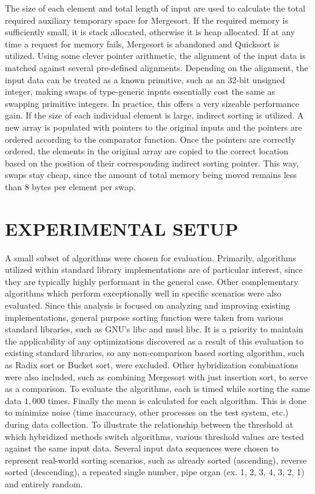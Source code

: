 \documentclass[12pt, conference]{ieeeconf}
\begin{document}
The size of each element and total length of input are used to calculate the
total required auxiliary temporary space for Mergesort. If the required memory
is sufficiently small, it is stack allocated, otherwise it is heap allocated. If
at any time a request for memory fails, Mergesort is abandoned and Quicksort is
utilized. Using some clever pointer arithmetic, the alignment of the input data
is matched against several pre-defined alignments. Depending on the alignment,
the input data can be treated as a known primitive, such as an 32-bit unsigned
integer, making swaps of type-generic inputs essentially cost the same as
swapping primitive integers. In practice, this offers a very sizeable
performance gain. If the size of each individual element is large, indirect
sorting is utilized. A new array is populated with pointers to the original
inputs and the pointers are ordered according to the comparator function. Once
the pointers are correctly ordered, the elements in the original array are
copied to the correct location based on the position of their corresponding
indirect sorting pointer. This way, swaps stay cheap, since the amount of total
memory being moved remains less than 8 bytes per element per swap.


\section{EXPERIMENTAL SETUP}

A small subset of algorithms were chosen for evaluation. Primarily, algorithms
utilized within standard library implementations are of particular interest,
since they are typically highly performant in the general case. Other
complementary algorithms which perform exceptionally well in specific scenarios
were also evaluated. Since this analysis is focused on analyzing and improving
existing implementations, general purpose sorting function were taken from
various standard libraries, such as GNU's libc\parencite{glibc} and musl
libc\parencite{musl_libc}. It is a priority to maintain the applicability of any
optimizations discovered as a result of this evaluation to existing standard
libraries, so any non-comparison based sorting algorithm, such as Radix sort or
Bucket sort, were excluded. Other hybridization combinations were also included,
such as combining Mergesort with just insertion sort, to serve as a comparison.
To evaluate the algorithms, each is timed while sorting the same data $1,000$
times. Finally the mean is calculated for each algorithm. This is done to
minimize noise (time inaccuracy, other processes on the test system, etc.)
during data collection. To illustrate the relationship between the threshold at
which hybridized methods switch algorithms, various threshold values are tested
against the same input data. Several input data sequences were chosen to
represent real-world sorting scenarios, such as already sorted (ascending),
reverse sorted (descending), a repeated single number, pipe organ (ex. 1, 2, 3,
4, 3, 2, 1) and entirely random.
\end{document}
